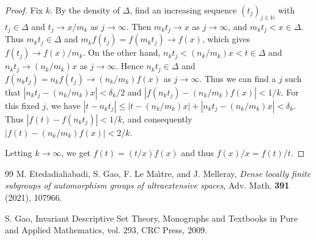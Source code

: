 \documentclass[10pt,a4paper]{amsart}
\theoremstyle{definition}
\theoremstyle{remark}
\begin{document}
\begin{proof}
    Fix $k$. By the density of $\Delta$, find an increasing sequence $(t_j)_{j\in \mathbb{N}}$ with $t_j \in \Delta$ and $t_j \to x/m_k$ as $j \to\infty$. Then $m_kt_j \to x$ as $j \to \infty$, and $m_kt_j < x \in \Delta$. Thus $m_kt_j\in \Delta$ and $m_kf(t_j)=f(m_kt_j) \to f(x)$, which gives $f(t_j) \to f(x)/m_k$. On the other hand, $n_kt_j < (n_k/m_k)x < t \in \Delta$ and $n_kt_j \to (n_k/m_k)x$ as $j\to\infty$. Hence $n_kt_j\in \Delta$ and $f(n_kt_j)=n_kf(t_j) \to (n_k/m_k)f(x)$ as $j \to \infty$. 
    Thus we can find a $j$ such that $|n_kt_j-(n_k/m_k)x|<\delta_k/2$ and $|f(n_kt_j)-(n_k/m_k)f(x)|<1/k$. For this fixed $j$, we have $|t-n_kt_j|\leq |t-(n_k/m_k)x|+|n_kt_j-(n_k/m_k)x|<\delta_k$. Thus $|f(t)-f(n_kt_j)|<1/k$, and consequently $|f(t)-(n_k/m_k)f(x)|<2/k$. 

    Letting $k \to \infty$, we get $f(t)=(t/x)f(x)$ and thus $f(x)/x=f(t)/t$. 
\end{proof}

\begin{thebibliography}{99}
M. Etedadialiabadi, S. Gao, F. Le Ma\^{\i}tre, and J. Melleray,
\textit{Dense locally finite subgroups of automorphism groups of ultraextensive spaces},
Adv. Math. {\bf 391} (2021), 107966.


S. Gao,
Invariant Descriptive Set Theory,
Monographs and Textbooks in Pure and Applied Mathematics, vol. 293,
CRC Press, 2009.

\end{thebibliography}
\end{document}

